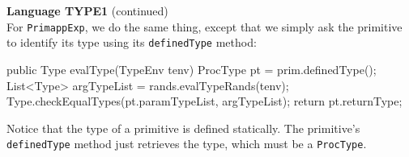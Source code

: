 \begin{minipage}[t]{\sw}
\slidenumber
\LARGE
{\bf Language TYPE1} (continued)\\[1.5ex]
For \verb'PrimappExp',
we do the same thing, except that we simply ask the primitive
to identify its type using its \verb'definedType' method:
\Large
\begin{qv}
    public Type evalType(TypeEnv tenv) {
        ProcType pt = prim.definedType();
        List<Type> argTypeList = rands.evalTypeRands(tenv);
        Type.checkEqualTypes(pt.paramTypeList, argTypeList);
        return pt.returnType;
    }
\end{qv}
\LARGE
Notice that the type of a primitive is defined statically.
The primitive's \verb'definedType' method just retrieves the type,
which must be a \verb'ProcType'.
\end{minipage}
